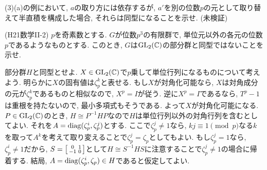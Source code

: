 \begin{prac}
(3)(a)の例において, $a$の取り方には依存するが, $a'$を別の位数$p$の元として取り替えて半直積を構成した場合, それらは同型になることを示せ. (未検証)
\end{prac}


\begin{egprob} (H21数学II-2)
$p$を奇素数とする. $G$が位数$p^3$の有限群で, 単位元以外の各元の位数$p$であるようなものとする. このとき, $G$は$\mathrm{GL}_{2}(\mathbb{C})$の部分群と同型ではないことを示せ.
\end{egprob}
\begin{egans}
部分群$H$と同型とせよ. $X\in \mathrm{GL}_{2}(\mathbb{C})$で$p$乗して単位行列になるものについて考えよう. 明らかに$X$の固有値は$\zeta_p^{k}$と表せる. もし$X$が対角化可能なら, $X$は対角成分の元が$\zeta_{p}^k$であるものと相似なので, $X^{p} = I$が従う. 逆に$X^p = I$であるなら, $T^p - 1$は重根を持たないので, 最小多項式もそうである. よって$X$が対角化可能になる.
$P\in \mathrm{GL}_{2}(\mathbb{C})$のとき,  $H\cong P^{-1}HP$なので$H$は単位行列以外の対角行列を含むとしてよい. それを$A=\mathrm{diag}(\zeta_p^i, \zeta_p^j)$とする. ここで$\zeta_p^j \neq 1$なら, $kj\equiv 1\pmod{p}$なる$k$を取って$A^k$を考えて取り変えることで$\zeta_p^j = \zeta_p$としてもよい. もし$\zeta_p^j = 1$なら, $\zeta_p^i \neq 1$だから, $S = \left[\begin{smallmatrix}0&1\\ -1&0\end{smallmatrix}\right]$として$H\cong S^{-1}HS$に注意することで$\zeta_p^j \neq 1$の場合に帰着する. 結局, $A=\mathrm{diag}(\zeta_p^i, \zeta_p)\in H$であると仮定してよい.


\end{egans}
